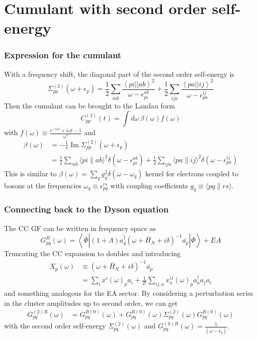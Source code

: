 \section{Cumulant with second order self-energy}
\begin{frame}
    \frametitle{Expression for the cumulant}
With a frequency shift, the diagonal part of the second order self-energy is
\begin{equation}
    \Sigma_{pp}^{(2)}(\omega+\epsilon_p) =
\frac{1}{2} \sum_{iab}
\frac{\left< pi \left| \right| ab \right>^2}
{\omega-\epsilon_{pi}^{ab}} + \frac{1}{2} \sum_{ija}
\frac{\left< pa \left| \right| ij \right>^2}
{\omega-\epsilon_{pa}^{ij}}
\end{equation}
Then the cumulant can be brought to the Landau form
\begin{equation}
    C_{pp}^{(2)}(t) = \int d\omega\, \beta(\omega) f(\omega)
\end{equation}
with $f(\omega) \equiv \frac{e^{-i \omega t}+i \omega t-1}{\omega^2} $ and
\begin{align}
    \beta(\omega) &= -\frac{1}{\pi} \operatorname{Im} \Sigma_{pp}^{(2)}\left(\omega+\epsilon_p\right) 
\label{eq:beta_def}\\
&=\frac{1}{2} \sum_{i a b}\langle p i \| a b\rangle^2 \delta\left(\omega-\epsilon_{p i}^{a b}\right)+\frac{1}{2} \sum_{i j a}\langle p a \| i j\rangle^2 \delta\left(\omega-\epsilon_{p a}^{i j}\right) \label{eq:beta_2nd}
\end{align}
This is similar to $\beta(\omega)=\sum_q g_q^2 \delta(\omega-\omega_q)$ kernel for electrons coupled to
bosons at the frequencies $\omega_q\equiv \epsilon_{pq}^{rs}$
with coupling coefficients $g_q \equiv \langle p q \| r s\rangle$.
\end{frame}
\begin{frame}
    \frametitle{Connecting back to the Dyson equation}
The CC GF can be written in frequency space as
\begin{equation}
    G_{pq}^R (\omega) = \left\langle \Phi \left| (1+\Lambda) \bar{a^{\dagger}_q}(\omega + \bar{H}_N + i\delta)^{-1} \bar{a_p} \right| \Phi \right\rangle + EA
\end{equation}
Truncating the CC expansion to doubles and introducing
\begin{align}
    X_p(\omega) & \equiv (\omega + \bar{H}_N + i\delta)^{-1} \bar{a_p} \\
& =\sum_i x^i(\omega)_p a_i+\frac{1}{2!} \sum_{ij, a} x_a^{ij}(\omega)_p a_a^{\dagger} a_j a_i
\end{align}
and something analogous for the EA sector. By considering a perturbation series in the cluster amplitudes up to second order, we can get
\begin{align}
    G_{pq}^{(2)R}(\omega)
&= G_{pq}^{R(0)} (\omega) + G_{pq}^{R(0)} (\omega) \Sigma_{pq}^{(2)}(\omega) G_{pq}^{R(0)} (\omega)
\end{align}
with the second order self-energy $\Sigma_{pq}^{(2)}(\omega)$ and $G_{pq}^{(0) R}(\omega)= \frac{1}{(\omega-\epsilon_q)}$.
\end{frame}
